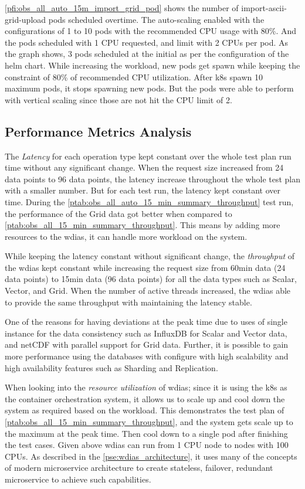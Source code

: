 \documentclass[conference]{IEEEtran}
\begin{document}
\cref{pfi:obs_all_auto_15m_import_grid_pod} shows the number of import-ascii-grid-upload pods scheduled overtime. The auto-scaling enabled with the configurations of 1 to 10 pods with the recommended CPU usage with 80\%. And the pods scheduled with 1 CPU requested, and limit with 2 CPUs per pod.
As the graph shows, 3 pods scheduled at the initial as per the configuration of the helm chart. While increasing the workload, new pods get spawn while keeping the constraint of 80\% of recommended CPU utilization. After \acrshort{k8s} spawn 10 maximum pods, it stops spawning new pods. But the pods were able to perform with vertical scaling since those are not hit the CPU limit of 2.

\subsection{Performance Metrics Analysis}
\label{psubse:performance_metrics}

The \emph{Latency} for each operation type kept constant over the whole test plan run time without any significant change. When the request size increased from 24 data points to 96 data points, the latency increase throughout the whole test plan with a smaller number. But for each test run, the latency kept constant over time.
During the \cref{ptab:obs_all_auto_15_min_summary_throughput} test run, the performance of the Grid data got better when compared to \cref{ptab:obs_all_15_min_summary_throughput}. This means by adding more resources to the \acrshort{wdias}, it can handle more workload on the system.

While keeping the latency constant without significant change, the \emph{throughput} of the \acrshort{wdias} kept constant while increasing the request size from 60min data (24 data points) to 15min data (96 data points) for all the data types such as Scalar, Vector, and Grid.
When the number of active threads increased, the \acrshort{wdias} able to provide the same throughput with maintaining the latency stable.

One of the reasons for having deviations at the peak time due to uses of single instance for the data consistency such as InfluxDB for Scalar and Vector data, and netCDF with parallel support for Grid data. Further, it is possible to gain more performance using the databases with configure with high scalability and high availability features such as Sharding and Replication.

When looking into the \emph{resource utilization} of \acrshort{wdias}; since it is using the \acrshort{k8s} as the container orchestration system, it allows us to scale up and cool down the system as required based on the workload. This demonstrates the test plan of \cref{ptab:obs_all_15_min_summary_throughput}, and the system gets scale up to the maximum at the peak time. Then cool down to a single pod after finishing the test cases.
Given above \acrshort{wdias} can run from 1 CPU node to nodes with 100 CPUs. As described in the \cref{pse:wdias_architecture}, it uses many of the concepts of modern microservice architecture to create stateless, failover, redundant microservice to achieve such capabilities.
\end{document}
